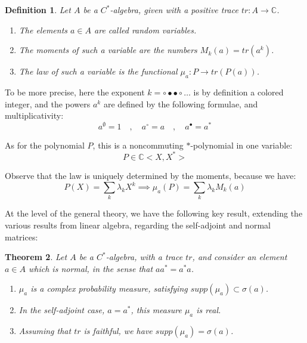 \documentclass[12pt]{amsbook}
\newtheorem{theorem}{Theorem}[chapter]
\newtheorem{definition}[theorem]{Definition}
\begin{document}
\begin{definition}
Let $A$ be a $C^*$-algebra, given with a positive trace $tr:A\to\mathbb C$.
\begin{enumerate}
\item The elements $a\in A$ are called random variables.

\item The moments of such a variable are the numbers $M_k(a)=tr(a^k)$.

\item The law of such a variable is the functional $\mu_a:P\to tr(P(a))$.
\end{enumerate}
\end{definition}

To be more precise, here the exponent $k=\circ\bullet\bullet\circ\ldots$ is by definition a colored integer, and the powers $a^k$ are defined by the following formulae, and multiplicativity: 
$$a^\emptyset=1\quad,\quad
a^\circ=a\quad,\quad
a^\bullet=a^*$$ 

As for the polynomial $P$, this is a noncommuting $*$-polynomial in one variable: 
$$P\in\mathbb C<X,X^*>$$

Observe that the law is uniquely determined by the moments, because we have:
$$P(X)=\sum_k\lambda_kX^k
\implies\mu_a(P)=\sum_k\lambda_kM_k(a)$$

At the level of the general theory, we have the following key result, extending the various results from linear algebra, regarding the self-adjoint and normal matrices:


\begin{theorem}
Let $A$ be a $C^*$-algebra, with a trace $tr$, and consider an element $a\in A$ which is normal, in the sense that $aa^*=a^*a$.
\begin{enumerate}
\item $\mu_a$ is a complex probability measure, satisfying $supp(\mu_a)\subset\sigma(a)$.

\item In the self-adjoint case, $a=a^*$, this measure $\mu_a$ is real.

\item Assuming that $tr$ is faithful, we have $supp(\mu_a)=\sigma(a)$.
\end{enumerate}
\end{theorem}
\end{document}
